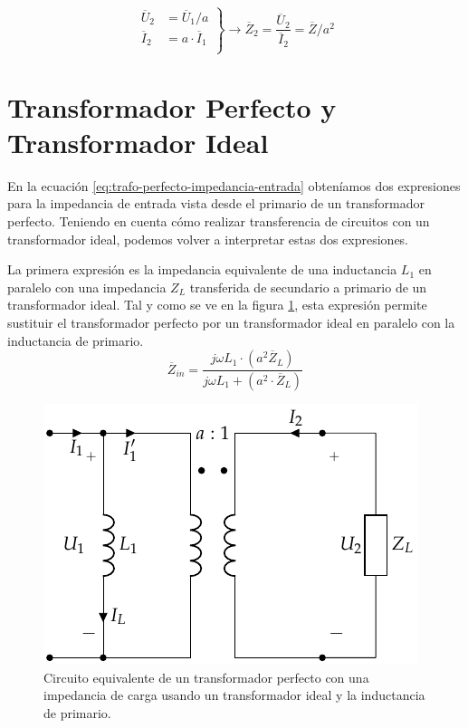 \begin{itemize}
\begin{center}
  \end{center}
  \[
    \left.
      \begin{array}{ll}
        \overline{U}_2 &= \overline{U}_1 /a\\
        \overline{I}_2 &= a \cdot \overline{I}_1\\
      \end{array}\right\}
    \rightarrow \boxed{\overline{Z}_2 =
      \frac{\overline{U}_2}{\overline{I}_2} = \overline{Z} / a^2}
  \]
\end{itemize}

\section{Transformador Perfecto y Transformador Ideal}
\label{sec:perfecto-vs-ideal}

En la ecuación \ref{eq:trafo-perfecto-impedancia-entrada} obteníamos dos expresiones para la impedancia de entrada vista desde el primario de un transformador perfecto. Teniendo en cuenta cómo realizar transferencia de circuitos con un transformador ideal, podemos volver a interpretar estas dos expresiones.

La primera expresión es la impedancia equivalente de una inductancia $L_1$ en paralelo con una impedancia $Z_L$ transferida de secundario a primario de un transformador ideal. Tal y como se ve en la figura \ref{fig:trafo-perfecto-ideal-L1}, esta expresión permite sustituir el transformador perfecto por un transformador ideal en paralelo con la inductancia de primario.
  \[
    \overline{Z}_{in} = \frac{j \omega L_1 \cdot (a^2
    \overline{Z}_L)}{j\omega L_1 + (a^2 \cdot \overline{Z}_L)}
  \]
  \begin{figure}
    \centering
    \includegraphics[height=.2\textheight]{../figs/TrafoPerfecto_Ideal.pdf}
    
    \caption{Circuito equivalente de un transformador perfecto con una impedancia de carga usando un transformador ideal y la inductancia de primario.}
    \label{fig:trafo-perfecto-ideal-L1}
  \end{figure}


